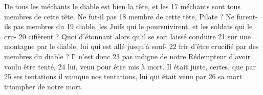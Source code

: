 De tous les méchants le diable est bien la tête, et les	 
17	 	méchants sont tous membres de cette tête. Ne fut-il pas	 
18	 	membre de cette tête, Pilate ? Ne furent-ils pas membres du	 
19	 	diable, les Juifs qui le poursuivirent, et les soldats qui le cru-	 
20	 	cifièrent ? Quoi d'étonnant alors qu'il se soit laissé conduire	 
21	 	sur une montagne par le diable, lui qui est allé jusqu'à souf-	 
22	 	frir d'être crucifié par des membres du diable ? Il n'est donc	 
23	 	pas indigne de notre Rédempteur d'avoir voulu être tenté,	 
24	 	lui, venu pour être mis à mort. Il était juste, certes, que par	 
25	 	ses tentations il vainque nos tentations, lui qui était venu par	 
26	 	sa mort triompher de notre mort.